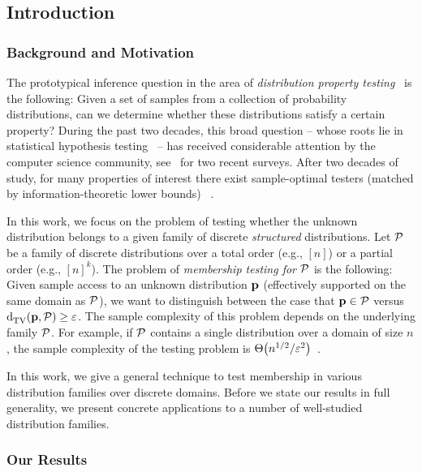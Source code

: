 \subsection{Introduction}  \label{sec:introduction:fourier}
\subsubsection{Background and Motivation} \label{ssec:background}

The prototypical inference question in the area of \emph{distribution property testing}~\cite{BFRSW:00}
is the following: Given a set of samples from a collection of probability distributions, can we
determine whether these distributions satisfy a certain property?
During the past two decades, this broad
question -- whose roots lie in statistical hypothesis testing~\cite{NeymannPearson:33,Lehmann:2005:book} --
has received considerable attention by the computer science community,
see~\cite{Rubinfeld:12:Survey, Canonne:15:Survey} for two recent surveys.
After two decades of study, for many properties of interest there exist
sample-optimal testers (matched by information-theoretic lower bounds)
~\cite{Paninski:08, CDVV:14, VV:14, DKN:15, DK:16}.

In this work, we focus on the problem of testing whether the unknown distribution
belongs to a given family of discrete \emph{structured} distributions.
Let $\mathcal{P}$ be a family of discrete distributions over a total order (e.g., $[n]$)
or a partial order (e.g., $[n]^k$). 
The problem of \emph{membership testing for $\mathcal{P}$} is the following:
Given sample access to an unknown distribution $\mathbf{p}$ (effectively supported 
on the same domain as $\mathcal{P}$),
we want to distinguish between the case that $\mathbf{p} \in \mathcal{P}$ versus ${\operatorname{d}_{\textrm{TV}}^{}\!\left({\mathbf{p}, \mathcal{P}}\right)} \geq \varepsilon$. 
The sample complexity of this problem depends on the underlying family
$\mathcal{P}$. For example, if $\cal P$ contains a single distribution over a domain of size $n$,
the sample complexity of the testing problem is $\bigTheta{n^{1/2}/\eps^2}$~\cite{CDVV:14, DKN:15}.

In this work, we give a general technique to test membership in various distribution families over discrete domains.
Before we state our results in full generality, we present concrete applications to 
a number of well-studied distribution families.

\subsubsection{Our Results} \label{ssec:results}

